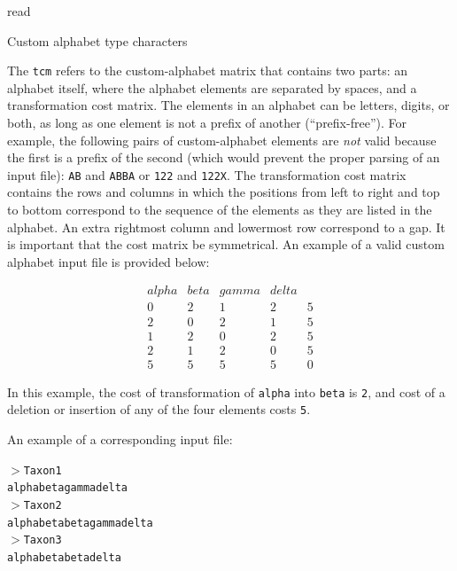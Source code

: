 \begin{command}{read}{}
\begin{arguments}
\begin{argumentgroup}{Custom alphabet type characters}
{             \setlength{\parindent}{0.5cm}                                
                \indent 
                The \texttt{tcm} refers to the custom-alphabet matrix that contains two parts:
            an alphabet itself, where the alphabet elements are separated by spaces, and a
            transformation cost matrix. The elements in an alphabet can be letters, digits, or
            both, as long as one element is not a prefix of another  (``prefix-free''). For
            example, the following pairs of custom-alphabet elements are \emph{not} valid
            because the first is a prefix of the second (which would prevent the proper parsing of
            an input file): \texttt{AB} and \texttt{ABBA} or \texttt{122} and \texttt{122X}.
            The transformation cost matrix contains the rows and columns in which the
            positions from left to right and top to bottom correspond to the sequence of the
            elements as they are listed in the alphabet. An extra rightmost column and lowermost
            row correspond to a gap. It is important that the cost matrix  be symmetrical. An example 
            of a valid custom alphabet input file is provided below:
       	  
            \begin{equation*}
                \begin{array}{lllll}
                      alpha & beta & gamma & delta &   \\
                    0 &     2 &    1 &     2 &     5 \\
                    2 &     0 &    2 &     1 &     5 \\
                    1 &     2 &    0 &     2 &     5 \\
                    2 &     1 &    2 &     0 &     5 \\
                    5 &     5 &    5 &     5 &     0
                 \end{array}
            \end{equation*} 

           In this example, the cost of transformation of \texttt{alpha} into \texttt{beta} is \texttt{2},
           and cost of a deletion or insertion of any of the four elements costs \texttt{5}.
           
           An example of a corresponding input file:
       \smallskip
       
           \texttt{$>$Taxon1\\
	alphabetagammadelta\\
	$>$Taxon2\\
	alphabetabetagammadelta\\
	$>$Taxon3\\
	alphabetabetadelta}
	
}
\end{argumentgroup}
\end{arguments}
\end{command}
